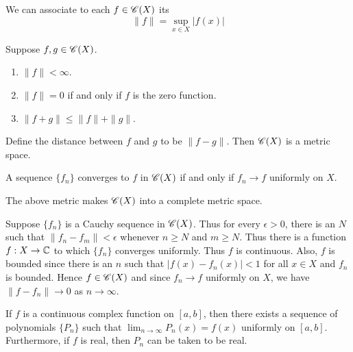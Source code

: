 \documentclass{mathnotes}
\begin{document}
\begin{defi}
  We can associate to each $f\in\mathscr{C}(X)$ its 
  $$\|f\|=\sup_{x\in X}|f(x)|$$
\end{defi}

\begin{prop}
  Suppose $f,g\in\mathscr{C}(X)$.
  \begin{enumerate}
    \item $\|f\|<\infty$.
    \item $\|f\|=0$ if and only if $f$ is the zero function.
    \item $\|f+g\|\le\|f\|+\|g\|$.
  \end{enumerate}
\end{prop}

\begin{prop}
  Define the distance between $f$ and $g$ to be $\|f-g\|$. Then $\mathscr{C}(X)$ is a
  metric space.
\end{prop}

\begin{prop}
  A sequence $\{f_n\}$ converges to $f$ in $\mathscr{C}(X)$ if and only if $f_n\to f$
  uniformly on $X$.
\end{prop}

\begin{prop}
  The above metric makes $\mathscr{C}(X)$ into a complete metric space.
\end{prop}

\begin{pf}
  Suppose $\{f_n\}$ is a Cauchy sequence in $\mathscr{C}(X)$. Thus for every
  $\epsilon>0$, there is an $N$ such that $\|f_n-f_m\|<\epsilon$ whenever $n\ge
  N$ and $m\ge N$. Thus there is a function $f:X\to\mathbb{C}$ to which $\{f_n\}$
  converges uniformly. Thus $f$ is continuous. Also, $f$ is bounded since there
  is an $n$ such that $|f(x)-f_n(x)|<1$ for all $x\in X$ and $f_n$ is bounded.
  Hence $f\in\mathscr{C}(X)$ and since $f_n\to f$ uniformly on $X$, we have
  $\|f-f_n\|\to0$ as $n\to\infty$.
\end{pf}

\begin{thm}
  If $f$ is a continuous complex function on $[a,b]$, then there exists a
  sequence of polynomials $\{P_n\}$ such that $\lim_{n\to\infty}P_n(x)=f(x)$
  uniformly on $[a,b]$. Furthermore, if $f$ is real, then $P_n$ can be taken to
  be real.
\end{thm}
\end{document}
